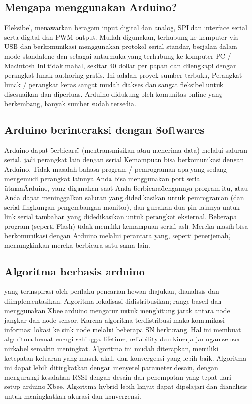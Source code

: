 \subsection{Mengapa menggunakan Arduino?}
Fleksibel, menawarkan beragam input digital dan analog, SPI dan interface serial serta digital dan PWM
output. Mudah digunakan, terhubung ke komputer via USB dan berkomunikasi menggunakan protokol serial standar, berjalan
dalam mode standalone dan sebagai antarmuka yang terhubung ke komputer PC / Macintosh
Ini tidak mahal, sekitar 30 dollar per papan dan dilengkapi dengan perangkat lunak authoring gratis. Ini adalah proyek sumber terbuka,
Perangkat lunak / perangkat keras sangat mudah diakses dan sangat fleksibel untuk disesuaikan dan diperluas. Arduino didukung
oleh komunitas online yang berkembang, banyak sumber sudah tersedia.

\subsection{Arduino berinteraksi dengan Softwares}
Arduino dapat \"berbicara\", (mentransmisikan atau menerima data) melalui saluran serial, jadi perangkat lain dengan serial
Kemampuan bisa berkomunikasi dengan Arduino. Tidak masalah bahasa program / pemrograman apa yang sedang mengemudi
perangkat lainnya Anda bisa menggunakan port serial \"utama\" Arduino, yang digunakan saat Anda \"berbicara\" dengannya
program itu, atau Anda dapat meninggalkan saluran yang didedikasikan untuk pemrograman (dan serial lingkungan pengembangan
monitor), dan gunakan dua pin lainnya untuk link serial tambahan yang didedikasikan untuk perangkat eksternal. Beberapa program (seperti
Flash) tidak memiliki kemampuan serial asli. Mereka masih bisa berkomunikasi dengan Arduino melalui perantara
yang, seperti \"penerjemah\", memungkinkan mereka berbicara satu sama lain.

\subsection{Algoritma berbasis arduino} 
yang terinspirasi oleh perilaku pencarian hewan diajukan, dianalisis dan diimplementasikan. Algoritma lokalisasi didistribusikan; range based dan menggunakan Xbee arduino mengatur untuk menghitung jarak antara node jangkar dan node sensor. Karena algoritma terdistribusi maka komunikasi informasi lokasi ke sink node melalui beberapa SN berkurang. Hal ini membuat algoritma hemat energi sehingga lifetime, reliability dan kinerja jaringan sensor nirkabel semakin meningkat. Algoritma ini mudah diterapkan, memiliki ketepatan keluaran yang masuk akal, dan konvergensi yang lebih baik. Algoritma ini dapat lebih ditingkatkan dengan menyetel parameter desain, dengan mengurangi kesalahan RSSI dengan desain dan penempatan yang tepat dari setup arduino Xbee. Algoritma hybrid lebih lanjut dapat dipelajari dan dianalisis untuk meningkatkan akurasi dan konvergensi.

